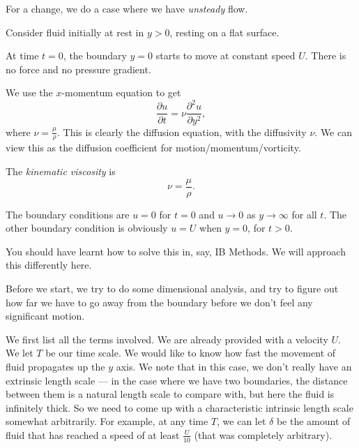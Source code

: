 \documentclass[a4paper]{article}
\begin{document}
For a change, we do a case where we have \emph{unsteady} flow.
\begin{eg}
  Consider fluid initially at rest in $y > 0$, resting on a flat surface.
  \begin{center}
  \end{center}
  At time $t = 0$, the boundary $y = 0$ starts to move at constant speed $U$. There is no force and no pressure gradient.

  We use the $x$-momentum equation to get
  \[
    \frac{\partial u}{\partial t} = \nu \frac{\partial^2 u}{\partial y^2},
  \]
  where $\nu = \frac{\mu}{\rho}$. This is clearly the diffusion equation, with the diffusivity $\nu$. We can view this as the diffusion coefficient for motion/momentum/vorticity.
  \begin{defi}
    The \emph{kinematic viscosity} is
    \[
      \nu = \frac{\mu}{\rho}.
    \]
  \end{defi}
  The boundary conditions are $u = 0$ for $t = 0$ and $u \to 0$ as $y \to \infty$ for all $t$. The other boundary condition is obviously $u = U$ when $y = 0$, for $t > 0$.

  You should have learnt how to solve this in, say, IB Methods. We will approach this differently here.

  Before we start, we try to do some dimensional analysis, and try to figure out how far we have to go away from the boundary before we don't feel any significant motion.

  We first list all the terms involved. We are already provided with a velocity $U$. We let $T$ be our time scale. We would like to know how fast the movement of fluid propagates up the $y$ axis. We note that in this case, we don't really have an extrinsic length scale --- in the case where we have two boundaries, the distance between them is a natural length scale to compare with, but here the fluid is infinitely thick. So we need to come up with a characteristic intrinsic length scale somewhat arbitrarily. For example, at any time $T$, we can let $\delta$ be the amount of fluid that has reached a speed of at least $\frac{U}{10}$ (that was completely arbitrary).


\end{eg}
\end{document}
